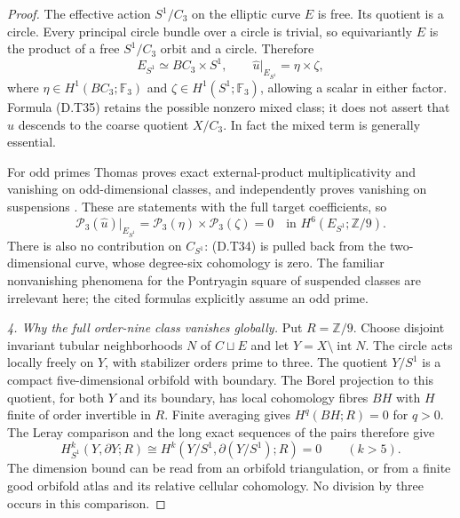 \begin{proof}
The effective action $S^1/C_3$ on the elliptic curve $E$ is free.
Its quotient is a circle. Every principal circle bundle over a
circle is trivial, so equivariantly $E$ is the product of a free
$S^1/C_3$ orbit and a circle. Therefore
\[
 E_{S^1}\simeq BC_3\times S^1,
 \qquad
 \widehat u|_{E_{S^1}}=\eta\times\zeta,                    \tag{D.T35}
\]
where $\eta\in H^1(BC_3;\mathbb F_3)$ and
$\zeta\in H^1(S^1;\mathbb F_3)$, allowing a scalar in either
factor. Formula (D.T35) retains the possible nonzero mixed class;
it does not assert that $u$ descends to the coarse quotient $X/C_3$.
In fact the mixed term is generally essential.

For odd primes Thomas proves exact external-product multiplicativity
and vanishing on odd-dimensional classes, and independently proves
vanishing on suspensions
\cite[equations (2.3), (2.5), (2.7), p.267]{ffThomas56}.
These are statements with the full target coefficients, so
\[
 \mathcal P_3(\widehat u)|_{E_{S^1}}
   =\mathcal P_3(\eta)\times\mathcal P_3(\zeta)=0
                       \quad\text{in }H^6(E_{S^1};\mathbb Z/9).
                                                               \tag{D.T36}
\]
There is also no contribution on $C_{S^1}$: (D.T34) is pulled back
from the two-dimensional curve, whose degree-six cohomology is zero.
The familiar nonvanishing phenomena for the Pontryagin square of
suspended classes are irrelevant here; the cited formulas explicitly
assume an odd prime.

\emph{4. Why the full order-nine class vanishes globally.}
Put $R=\mathbb Z/9$. Choose disjoint invariant tubular neighborhoods
$N$ of $C\sqcup E$ and let $Y=X\setminus\operatorname{int}N$.
The circle acts locally freely on $Y$, with stabilizer orders prime
to three. The quotient $Y/S^1$ is a compact five-dimensional orbifold
with boundary. The Borel projection to this quotient, for both $Y$
and its boundary, has local cohomology fibres $BH$ with $H$ finite
of order invertible in $R$. Finite averaging gives
$H^q(BH;R)=0$ for $q>0$. The Leray comparison and the long exact
sequences of the pairs therefore give
\[
 H^k_{S^1}(Y,\partial Y;R)
             \cong H^k(Y/S^1,\partial(Y/S^1);R)=0
                            \qquad(k>5).                     \tag{D.T37}
\]
The dimension bound can be read from an orbifold triangulation,
or from a finite good orbifold atlas and its relative cellular
cohomology. No division by three occurs in this comparison.


\end{proof}
